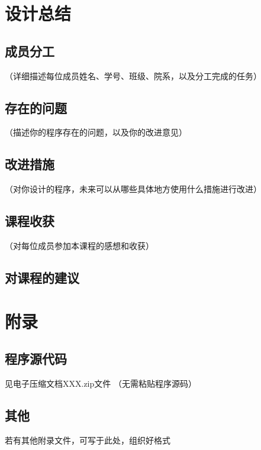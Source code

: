 \documentclass[UTF8,AutoFakeBold,AutoFakeSlant,zihao=-4]{ctexart}
\begin{document}
\section{设计总结}

\subsection{成员分工}
（详细描述每位成员姓名、学号、班级、院系，以及分工完成的任务）

\subsection{存在的问题}
（描述你的程序存在的问题，以及你的改进意见）

\subsection{改进措施}
（对你设计的程序，未来可以从哪些具体地方使用什么措施进行改进）

\subsection{课程收获}
（对每位成员参加本课程的感想和收获）

\subsection{对课程的建议}

\section{附录}
\subsection{程序源代码}
见电子压缩文档XXX.zip文件
（无需粘贴程序源码）

\subsection{其他}
若有其他附录文件，可写于此处，组织好格式
\end{document}
